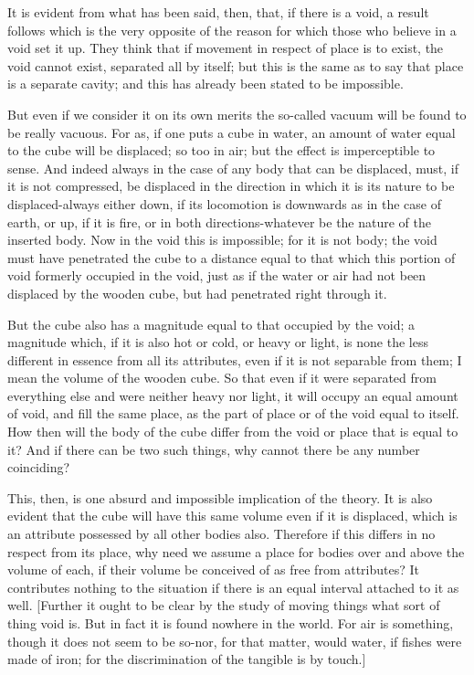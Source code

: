 It is evident from what has been said, then, that, if there is a void,
a result follows which is the very opposite of the reason for which
those who believe in a void set it up. They think that if movement
in respect of place is to exist, the void cannot exist, separated
all by itself; but this is the same as to say that place is a separate
cavity; and this has already been stated to be impossible.

But even if we consider it on its own merits the so-called vacuum
will be found to be really vacuous. For as, if one puts a cube in
water, an amount of water equal to the cube will be displaced; so
too in air; but the effect is imperceptible to sense. And indeed always
in the case of any body that can be displaced, must, if it is not
compressed, be displaced in the direction in which it is its nature
to be displaced-always either down, if its locomotion is downwards
as in the case of earth, or up, if it is fire, or in both directions-whatever
be the nature of the inserted body. Now in the void this is impossible;
for it is not body; the void must have penetrated the cube to a distance
equal to that which this portion of void formerly occupied in the
void, just as if the water or air had not been displaced by the wooden
cube, but had penetrated right through it. 

But the cube also has a magnitude equal to that occupied by the void;
a magnitude which, if it is also hot or cold, or heavy or light, is
none the less different in essence from all its attributes, even if
it is not separable from them; I mean the volume of the wooden cube.
So that even if it were separated from everything else and were neither
heavy nor light, it will occupy an equal amount of void, and fill
the same place, as the part of place or of the void equal to itself.
How then will the body of the cube differ from the void or place that
is equal to it? And if there can be two such things, why cannot there
be any number coinciding? 

This, then, is one absurd and impossible implication of the theory.
It is also evident that the cube will have this same volume even if
it is displaced, which is an attribute possessed by all other bodies
also. Therefore if this differs in no respect from its place, why
need we assume a place for bodies over and above the volume of each,
if their volume be conceived of as free from attributes? It contributes
nothing to the situation if there is an equal interval attached to
it as well. [Further it ought to be clear by the study of moving things
what sort of thing void is. But in fact it is found nowhere in the
world. For air is something, though it does not seem to be so-nor,
for that matter, would water, if fishes were made of iron; for the
discrimination of the tangible is by touch.] 


